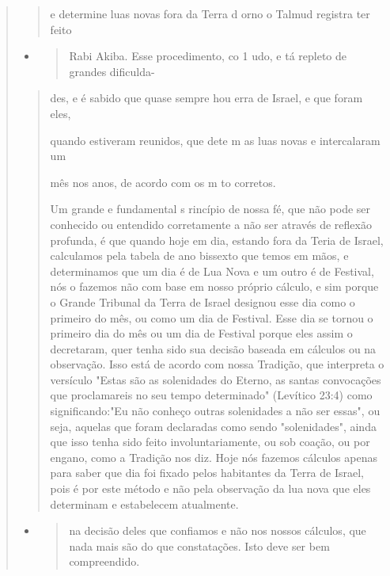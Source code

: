 \begin{quote}
\begin{quote}
e determine luas novas fora da Terra d orno o Talmud registra ter feito
\end{quote}

\begin{itemize}
\item
 \begin{quote}
 Rabi Akiba. Esse procedimento, co 1 udo, e tá repleto de grandes
 dificulda-
 \end{quote}
\end{itemize}

\begin{quote}
des, e é sabido que quase sempre hou erra de Israel, e que foram eles,

quando estiveram reunidos, que dete m as luas novas e intercalaram um

mês nos anos, de acordo com os m to corretos.

Um grande e fundamental s rincípio de nossa fé, que não pode ser
conhecido ou entendido corretamente a não ser através de reflexão
profunda, é que quando hoje em dia, estando fora da Teria de Israel,
calculamos pela ta­bela de ano bissexto que temos em mãos, e
determinamos que um dia é de Lua Nova e um outro é de Festival, nós o
fazemos não com base em nosso próprio cálculo, e sim porque o Grande
Tribunal da Terra de Israel designou esse dia como o primeiro do mês, ou
como um dia de Festival. Esse dia se tornou o primeiro dia do mês ou um
dia de Festival porque eles assim o decretaram, quer tenha sido sua
decisão baseada em cálculos ou na observação. Isso está de acordo com
nossa Tradição, que interpreta o versículo "Estas são as solenidades do
Eterno, as santas convocações que proclamareis no seu tempo determinado"
(Levítico 23:4) como significando:"Eu não conheço outras solenidades a
não ser essas", ou seja, aquelas que foram declaradas como sendo
"solenidades", ainda que isso tenha sido feito involuntariamente, ou sob
coação, ou por enga­no, como a Tradição nos diz. Hoje nós fazemos
cálculos apenas para saber que dia foi fixado pelos habitantes da Terra
de Israel, pois é por este método e não pela observação da lua nova que
eles determinam e estabelecem atualmente.
\end{quote}

\begin{itemize}
\item
 \begin{quote}
 na decisão deles que confiamos e não nos nossos cálculos, que nada
 mais são do que constatações. Isto deve ser bem compreendido.
 \end{quote}
\end{itemize}


\end{quote}
